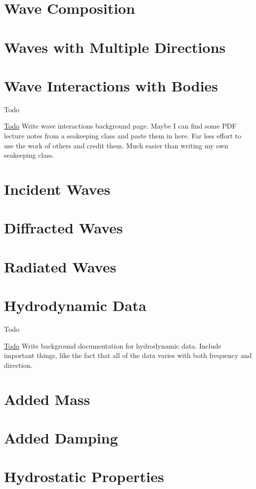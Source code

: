 \section*{Wave Composition}

\section*{Waves with Multiple Directions}\hypertarget{wave_interactions_with_bodies}{}\section{Wave Interactions with Bodies}\label{wave_interactions_with_bodies}
\begin{DoxyRefDesc}{Todo}
\item[\hyperlink{todo__todo000042}{Todo}]Write wave interactions background page. Maybe I can find some P\-D\-F lecture notes from a seakeeping class and paste them in here. Far less effort to use the work of others and credit them. Much easier than writing my own seakeeping class.\end{DoxyRefDesc}


\section*{Incident Waves}

\section*{Diffracted Waves}

\section*{Radiated Waves}\hypertarget{hydrodynamic_data}{}\section{Hydrodynamic Data}\label{hydrodynamic_data}
\begin{DoxyRefDesc}{Todo}
\item[\hyperlink{todo__todo000040}{Todo}]Write background documentation for hydrodynamic data. Include important things, like the fact that all of the data varies with both frequency and direction.\end{DoxyRefDesc}


\section*{Added Mass}

\section*{Added Damping}

\section*{Hydrostatic Properties}